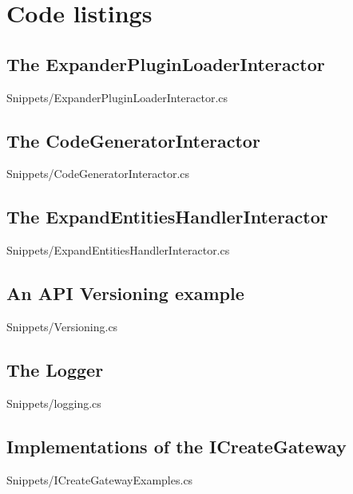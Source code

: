 \chapter{Code listings} \label{appendix_code_listings} 

\section{The ExpanderPluginLoaderInteractor}
 
{Snippets/ExpanderPluginLoaderInteractor.cs}

\section{The CodeGeneratorInteractor}
 
{Snippets/CodeGeneratorInteractor.cs}

\section{The ExpandEntitiesHandlerInteractor}
 
{Snippets/ExpandEntitiesHandlerInteractor.cs}

\section{An API Versioning example}
 
{Snippets/Versioning.cs}

\section{The Logger}
 
{Snippets/logging.cs}

\section{Implementations of the ICreateGateway}

{Snippets/ICreateGatewayExamples.cs}

